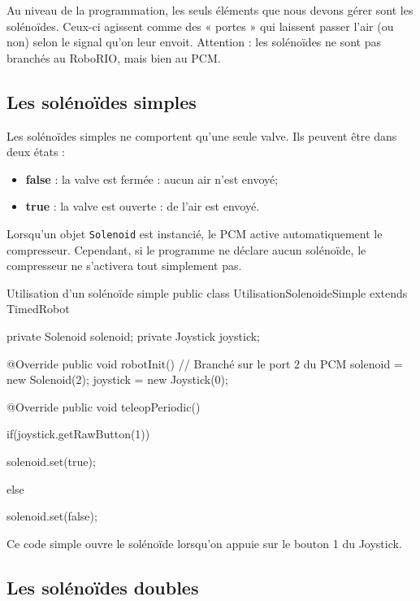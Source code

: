 \documentclass[12pt]{report}
\begin{document}
Au niveau de la programmation, les seuls éléments que nous devons gérer sont les solénoïdes. Ceux-ci agissent comme des « portes » qui laissent passer l'air (ou non) selon le signal qu'on leur envoit. Attention : les solénoïdes ne sont pas branchés au RoboRIO, mais bien au PCM.



\subsection{Les solénoïdes simples}

Les solénoïdes simples ne comportent qu'une seule valve. Ils peuvent être dans deux états :

\begin{itemize}
	\item \textbf{false} : la valve est fermée : aucun air n'est envoyé;
	\item \textbf{true} : la valve est ouverte : de l'air est envoyé.
\end{itemize}

Lorsqu'un objet \texttt{Solenoid} est instancié, le PCM active automatiquement le compresseur. Cependant, si le programme ne déclare aucun solénoïde, le compresseur ne s'activera tout simplement pas.

\begin{MyTCB}{Utilisation d'un solénoïde simple}
public class UtilisationSolenoideSimple extends TimedRobot {
	
	private Solenoid solenoid;
	private Joystick joystick;
	
	@Override
	public void robotInit() {
		// Branché sur le port 2 du PCM
		solenoid = new Solenoid(2);
		joystick = new Joystick(0);
	}
	
	@Override
	public void teleopPeriodic() {
	
		if(joystick.getRawButton(1)) {
		
			solenoid.set(true);		
			
		} else {
		
			solenoid.set(false);
			
		}
		
	}

}
\end{MyTCB}

Ce code simple ouvre le solénoïde lorsqu'on appuie sur le bouton 1 du Joystick.



\subsection{Les solénoïdes doubles}
\end{document}
